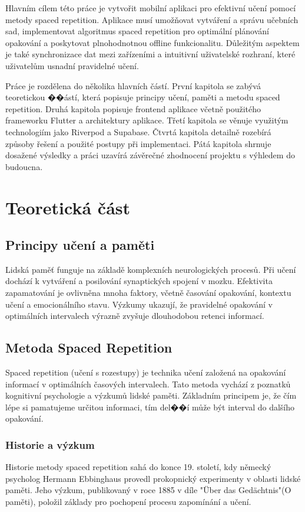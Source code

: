 \documentclass[12pt, a4paper, oneside]{report}
\begin{document}
Hlavním cílem této práce je vytvořit mobilní aplikaci pro efektivní učení pomocí metody spaced repetition. Aplikace musí umožňovat vytváření a správu učebních sad, implementovat algoritmus spaced repetition pro optimální plánování opakování a poskytovat plnohodnotnou offline funkcionalitu. Důležitým aspektem je také synchronizace dat mezi zařízeními a intuitivní uživatelské rozhraní, které uživatelům usnadní pravidelné učení.

Práce je rozdělena do několika hlavních částí. První kapitola se zabývá teoretickou ��ástí, která popisuje principy učení, paměti a metodu spaced repetition. Druhá kapitola popisuje frontend aplikace včetně použitého frameworku Flutter a architektury aplikace. Třetí kapitola se věnuje využitým technologiím jako Riverpod a Supabase. Čtvrtá kapitola detailně rozebírá způsoby řešení a použité postupy při implementaci. Pátá kapitola shrnuje dosažené výsledky a práci uzavírá závěrečné zhodnocení projektu s výhledem do budoucna.

\chapter{Teoretická část}
	\section{Principy učení a paměti}
	Lidská paměť funguje na základě komplexních neurologických procesů. Při učení dochází k vytváření a posilování synaptických spojení v mozku. Efektivita zapamatování je ovlivněna mnoha faktory, včetně časování opakování, kontextu učení a emocionálního stavu. Výzkumy ukazují, že pravidelné opakování v optimálních intervalech výrazně zvyšuje dlouhodobou retenci informací.

	\section{Metoda Spaced Repetition}
	Spaced repetition (učení s rozestupy) je technika učení založená na opakování informací v optimálních časových intervalech. Tato metoda vychází z poznatků kognitivní psychologie a výzkumů lidské paměti. Základním principem je, že čím lépe si pamatujeme určitou informaci, tím del��í může být interval do dalšího opakování.

	\subsection{Historie a výzkum}
	Historie metody spaced repetition sahá do konce 19. století, kdy německý psycholog Hermann Ebbinghaus provedl prokopnický experimenty v oblasti lidské paměti. Jeho výzkum, publikovaný v roce 1885 v díle "Über das Gedächtnis"(O paměti), položil základy pro pochopení procesu zapomínání a učení.
\end{document}
